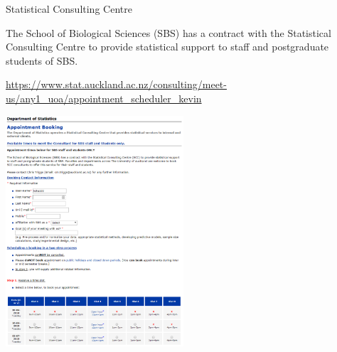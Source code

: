 \documentclass[ignorenonframetext,]{beamer}
\begin{document}
\begin{frame}{Statistical Consulting Centre}

The School of Biological Sciences (SBS) has a contract with the
Statistical Consulting Centre to provide statistical support to staff
and postgraduate students of SBS.

\url{https://www.stat.auckland.ac.nz/consulting/meet-us/any1_uoa/appointment_scheduler_kevin}

\center \includegraphics[width=2.60417in]{Figure/sbs booking.png}

\end{frame}
\end{document}
